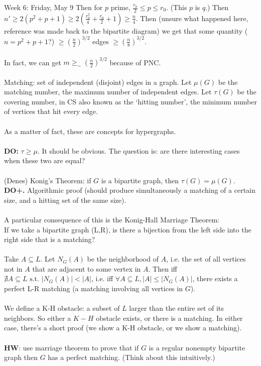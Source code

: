 \documentclass[12pt]{article}
\theoremstyle{remark}
\newcommand{\st}{\text{ s.t. }}
\begin{document}
\begin{section}{Week 6: Friday, May 9}
 Then for $p$ prime, $\frac {r_0}{2} \leq p \leq r_0$. (This $p$ is $q$.) Then $n' \geq 2(p^2 + p + 1 ) \geq 2(\frac{r_0^2}{4} + \frac{r_0}{2} + 1 ) \geq \frac n 4$. Then (unsure what happened here, reference was made back to the bipartite diagram) we get that some quantity ($n = p^2+p+1$?) $\geq (\frac n 2)^{3/2}$ edges $ \geq (\frac n 8)^{3/2}$.
 \\\\
 In fact, we can get $m \geq_\sim (\frac n 2)^{3/2}$ because of PNC.
 \\\\
 Matching: set of independent (disjoint) edges in a graph. Let $\mu(G)$ be the matching number, the maximum number of independent edges. Let $\tau(G)$ be the covering number, in CS also known as the `hitting number', the minimum number of vertices that hit every edge. 
 \\\\
 As a matter of fact, these are concepts for hypergraphs. 
 \\\\
 \textbf{DO:} $\tau \geq \mu$. It should be obvious. The question is: are there interesting cases when these two are equal? 
 \\\\ (Denes) Konig's Theorem: if $G$ is a bipartite graph, then $\tau(G) = \mu(G)$. \textbf{DO+.} Algorithmic proof (should produce simultaneously a matching of a certain size, and a hitting set of the same size). 
 \\\\
 A particular consequence of this is the Konig-Hall Marriage Theorem:
 \\If we take a bipartite graph (L,R), is there a bijection from the left side into the right side that is a matching? 
\\\\
Take $A \subseteq L$. Let $N_G(A)$ be the neighborhood of $A$, i.e. the set of all vertices not in $A$ that are adjacent to some vertex in $A$. Then iff $\nexists A \subseteq L \st |N_G(A) | < |A|$, i.e. iff $\forall A \subseteq L, |A|\leq |N_G(A)|$, there exists a perfect L-R matching (a matching involving all vertices in $G$). 
\\\\
We define a K-H obstacle: a subset of $L$ larger than the entire set of its neighbors. So either a $K-H$ obstacle exists, or there is a matching. In either case, there's a short proof (we show a K-H obstacle, or we show a matching). 
\\\\
\textbf{HW}: use marriage theorem to prove that if $G$ is a regular nonempty bipartite graph then $G$ has a perfect matching. (Think about this intuitively.)
\end{section}
\end{document}
